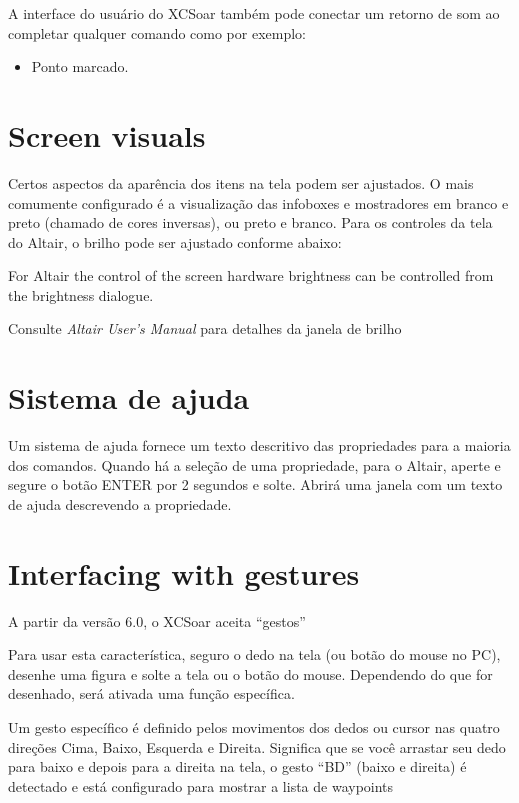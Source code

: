 A interface do usuário do XCSoar também pode conectar um retorno de som ao completar qualquer comando como por exemplo:
\begin{itemize}
\item Ponto marcado.
\end{itemize}


\section{Screen visuals}

Certos aspectos da aparência dos itens na tela podem ser ajustados.  O mais comumente configurado é a visualização das infoboxes e mostradores em branco e preto (chamado de cores inversas), ou preto e branco.
Para os controles da tela do Altair, o brilho pode ser ajustado conforme abaixo:


For Altair the control of the screen hardware 
brightness can be controlled from the brightness dialogue.
\begin{quote}
\blink{}
\end{quote}

Consulte {\em Altair User's Manual} para detalhes da janela de brilho


\section{Sistema de ajuda}

Um sistema de ajuda fornece um texto descritivo das propriedades para a maioria dos comandos.  Quando há a seleção de uma propriedade, para o Altair, aperte e segure o botão ENTER por 2 segundos e solte. Abrirá uma janela com um texto de ajuda descrevendo a propriedade.  

\section{Interfacing with gestures}\label{sec:gestures}
A partir da versão 6.0, o XCSoar aceita “gestos”

Para usar esta característica, seguro o dedo na tela (ou botão do mouse no PC), desenhe 
uma figura e solte a tela ou o botão do mouse.  Dependendo do que for desenhado, será 
ativada uma função específica. 

Um gesto específico é definido pelos movimentos dos dedos ou cursor nas quatro direções 
Cima, Baixo, Esquerda e Direita.  Significa que se você arrastar seu dedo para baixo e 
depois para a direita na tela,  o gesto “BD” (baixo e direita) é detectado e 
está configurado para mostrar a lista de waypoints
 
